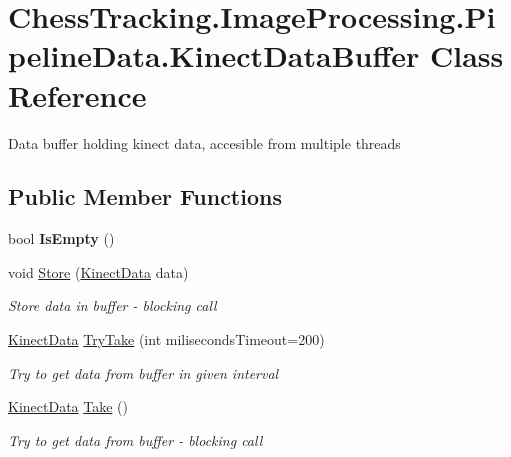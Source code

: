 \hypertarget{class_chess_tracking_1_1_image_processing_1_1_pipeline_data_1_1_kinect_data_buffer}{}\section{Chess\+Tracking.\+Image\+Processing.\+Pipeline\+Data.\+Kinect\+Data\+Buffer Class Reference}
\label{class_chess_tracking_1_1_image_processing_1_1_pipeline_data_1_1_kinect_data_buffer}


Data buffer holding kinect data, accesible from multiple threads  


\subsection*{Public Member Functions}
\begin{DoxyCompactItemize}
\item 
\mbox{\label{class_chess_tracking_1_1_image_processing_1_1_pipeline_data_1_1_kinect_data_buffer_ad45109086afe8c8ec1e39acd43044646}} 
bool {\bfseries Is\+Empty} ()
\item 
void \mbox{\hyperlink{class_chess_tracking_1_1_image_processing_1_1_pipeline_data_1_1_kinect_data_buffer_a9744c849f88289fb5ec180f9ec99a9f3}{Store}} (\mbox{\hyperlink{class_chess_tracking_1_1_image_processing_1_1_pipeline_data_1_1_kinect_data}{Kinect\+Data}} data)
\begin{DoxyCompactList}\small\item\em Store data in buffer -\/ blocking call \end{DoxyCompactList}\item 
\mbox{\hyperlink{class_chess_tracking_1_1_image_processing_1_1_pipeline_data_1_1_kinect_data}{Kinect\+Data}} \mbox{\hyperlink{class_chess_tracking_1_1_image_processing_1_1_pipeline_data_1_1_kinect_data_buffer_a6309fa36d0985a0d8ea72718155a5d9f}{Try\+Take}} (int miliseconds\+Timeout=200)
\begin{DoxyCompactList}\small\item\em Try to get data from buffer in given interval \end{DoxyCompactList}\item 
\mbox{\hyperlink{class_chess_tracking_1_1_image_processing_1_1_pipeline_data_1_1_kinect_data}{Kinect\+Data}} \mbox{\hyperlink{class_chess_tracking_1_1_image_processing_1_1_pipeline_data_1_1_kinect_data_buffer_a4a0b205edd0724a90ad3c46a91bd6b10}{Take}} ()
\begin{DoxyCompactList}\small\item\em Try to get data from buffer -\/ blocking call \end{DoxyCompactList}\end{DoxyCompactItemize}

